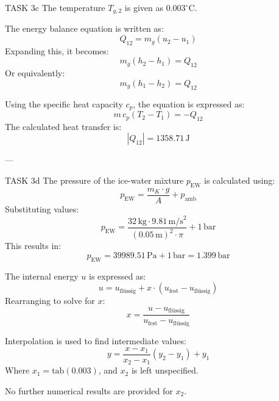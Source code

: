 TASK 3c  
The temperature \( T_{g,2} \) is given as \( 0.003^\circ\text{C} \).  

The energy balance equation is written as:  
\[
Q_{12} = m_g (u_2 - u_1)
\]  
Expanding this, it becomes:  
\[
m_g (h_2 - h_1) = Q_{12}
\]  
Or equivalently:  
\[
m_g (h_1 - h_2) = Q_{12}
\]  

Using the specific heat capacity \( c_p \), the equation is expressed as:  
\[
m \, c_p (T_2 - T_1) = -Q_{12}
\]  
The calculated heat transfer is:  
\[
|Q_{12}| = 1358.71 \, \text{J}
\]  

---

TASK 3d  
The pressure of the ice-water mixture \( p_{\text{EW}} \) is calculated using:  
\[
p_{\text{EW}} = \frac{m_K \cdot g}{A} + p_{\text{amb}}
\]  
Substituting values:  
\[
p_{\text{EW}} = \frac{32 \, \text{kg} \cdot 9.81 \, \text{m/s}^2}{(0.05 \, \text{m})^2 \cdot \pi} + 1 \, \text{bar}
\]  
This results in:  
\[
p_{\text{EW}} = 39989.51 \, \text{Pa} + 1 \, \text{bar} = 1.399 \, \text{bar}
\]  

The internal energy \( u \) is expressed as:  
\[
u = u_{\text{flüssig}} + x \cdot (u_{\text{fest}} - u_{\text{flüssig}})
\]  
Rearranging to solve for \( x \):  
\[
x = \frac{u - u_{\text{flüssig}}}{u_{\text{fest}} - u_{\text{flüssig}}}
\]  

Interpolation is used to find intermediate values:  
\[
y = \frac{x - x_1}{x_2 - x_1} (y_2 - y_1) + y_1
\]  
Where \( x_1 = \text{tab}(0.003) \), and \( x_2 \) is left unspecified.  

No further numerical results are provided for \( x_2 \).